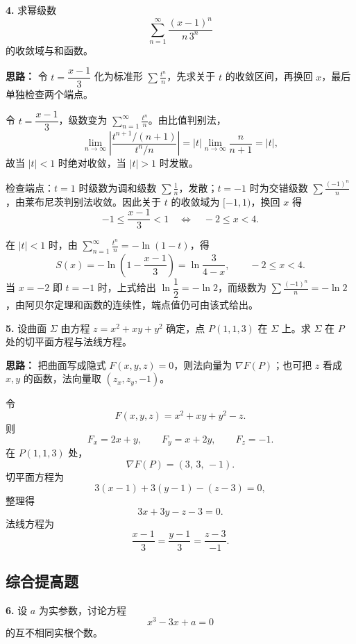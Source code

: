 \textbf{4.} 求幂级数
\[
\sum_{n=1}^{\infty}\frac{(x-1)^n}{n\,3^n}
\]
的收敛域与和函数。

\ifshowsolutions%

\textbf{思路：} 令 $t=\dfrac{x-1}{3}$ 化为标准形 $\sum \frac{t^n}{n}$，先求关于 $t$ 的收敛区间，再换回 $x$，最后单独检查两个端点。

令 $t=\dfrac{x-1}{3}$，级数变为 $\displaystyle\sum_{n=1}^{\infty}\frac{t^n}{n}$。由比值判别法，
\[
\lim_{n\to\infty}\left|\frac{t^{n+1}/(n+1)}{t^n/n}\right|
=|t|\lim_{n\to\infty}\frac{n}{n+1}=|t|,
\]
故当 $|t|<1$ 时绝对收敛，当 $|t|>1$ 时发散。

检查端点：$t=1$ 时级数为调和级数 $\sum \frac1n$，发散；$t=-1$ 时为交错级数 $\sum\frac{(-1)^n}{n}$，由莱布尼茨判别法收敛。因此关于 $t$ 的收敛域为 $[-1,1)$，换回 $x$ 得
\[
-1\le \frac{x-1}{3}<1
\quad\Longleftrightarrow\quad
-2\le x<4.
\]

在 $|t|<1$ 时，由 $\displaystyle\sum_{n=1}^{\infty}\frac{t^n}{n}=-\ln(1-t)$，得
\[
S(x)=-\ln\left(1-\frac{x-1}{3}\right)
=\ln\frac{3}{4-x},\qquad -2\le x<4.
\]
当 $x=-2$ 即 $t=-1$ 时，上式给出 $\ln\dfrac12=-\ln2$，而级数为 $\sum\frac{(-1)^n}{n}=-\ln2$，由阿贝尔定理和函数的连续性，端点值仍可由该式给出。
\boxed{\text{答案：}\text{收敛域 }[-2,4),\ S(x)=\ln\frac{3}{4-x}}
\else \answerarea[8] \fi%

\textbf{5.} 设曲面 $\Sigma$ 由方程 $z=x^2+xy+y^2$ 确定，点 $P(1,1,3)$ 在 $\Sigma$ 上。求 $\Sigma$ 在 $P$ 处的切平面方程与法线方程。

\ifshowsolutions%

\textbf{思路：} 把曲面写成隐式 $F(x,y,z)=0$，则法向量为 $\nabla F(P)$；也可把 $z$ 看成 $x,y$ 的函数，法向量取 $(z_x,z_y,-1)$。

令
\[
F(x,y,z)=x^2+xy+y^2-z.
\]
则
\[
F_x=2x+y,\qquad F_y=x+2y,\qquad F_z=-1.
\]
在 $P(1,1,3)$ 处，
\[
\nabla F(P)=(3,\,3,\,-1).
\]
切平面方程为
\[
3(x-1)+3(y-1)-(z-3)=0,
\]
整理得
\[
3x+3y-z-3=0.
\]
法线方程为
\[
\frac{x-1}{3}=\frac{y-1}{3}=\frac{z-3}{-1}.
\]
\else \answerarea[6] \fi%

\subsection{综合提高题}

\textbf{6.} 设 $a$ 为实参数，讨论方程
\[
x^3-3x+a=0
\]
的互不相同实根个数。

\ifshowsolutions%

